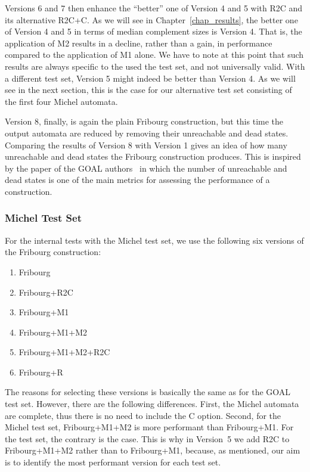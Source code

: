 Versions 6 and 7 then enhance the ``better'' one of Version 4 and 5 with R2C and its alternative R2C+C. As we will see in Chapter~\ref{chap_results}, the better one of Version 4 and 5 in terms of median complement sizes is Version 4. That is, the application of M2 results in a decline, rather than a gain, in performance compared to the application of M1 alone. We have to note at this point that such results are always specific to the used the test set, and not universally valid. With a different test set, Version 5 might indeed be better than Version 4. As we will see in the next section, this is the case for our alternative test set consisting of the first four Michel automata.

Version 8, finally, is again the plain Fribourg construction, but this time the output automata are reduced by removing their unreachable and dead states. Comparing the results of Version 8 with Version 1 gives an idea of how many unreachable and dead states the Fribourg construction produces. This is inspired by the paper of the GOAL authors~\cite{2011_tsai} in which the number of unreachable and dead states is one of the main metrics for assessing the performance of a construction.

\subsubsection{Michel Test Set}
For the internal tests with the Michel test set, we use the following six versions of the Fribourg construction:
\begin{enumerate}
\item Fribourg
\item Fribourg+R2C
\item Fribourg+M1
\item Fribourg+M1+M2
\item Fribourg+M1+M2+R2C
\item Fribourg+R
\end{enumerate}

The reasons for selecting these versions is basically the same as for the GOAL test set. However, there are the following differences. First, the Michel automata are complete, thus there is no need to include the C option. Second, for the Michel test set, Fribourg+M1+M2 is more performant than Fribourg+M1. For the \goal{} test set, the contrary is the case. This is why in Version~5 we add R2C to Fribourg+M1+M2 rather than to Fribourg+M1, because, as mentioned, our aim is to identify the most performant version for each test set.


